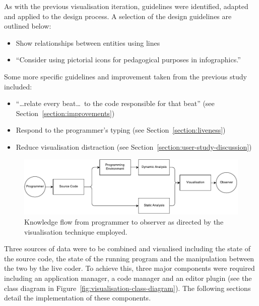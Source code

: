 As with the previous visualisation iteration, guidelines were identified, adapted and applied to the design process. A selection of the design guidelines are outlined below:

\begin{itemize}
\item Show relationships between entities using lines~\cite[p.~183]{Ware2013a} 
\item ``Consider using pictorial icons for pedagogical purposes in infographics.''~\cite[p.~320]{Ware2013a} 
\end{itemize}

Some more specific guidelines and improvement taken from the previous study included:

\begin{itemize}
\item ``\ldots relate every beat\ldots~to the code responsible for that beat'' (see Section~\ref{section:improvements}) 
\item Respond to the programmer's typing (see Section~\ref{section:liveness}) 
\item Reduce visualisation distraction (see Section~\ref{section:user-study-discussion}) 

\end{itemize}



\begin{figure}
  \centering \includegraphics[width=\columnwidth]{../images/diagrams/knowledge-flow-refined.pdf}
  \caption{Knowledge flow from programmer to observer as directed by the visualisation technique employed.}
\label{fig:knowledge-flow-refined}
\end{figure}

Three sources of data were to be combined and visualised including the state of the source code, the state of the running program and the manipulation between the two by the live coder. To achieve this, three major components were required including an application manager, a code manager and an editor plugin (see the class diagram in Figure~\ref{fig:visualisation-class-diagram}). The following sections detail the implementation of these components.


